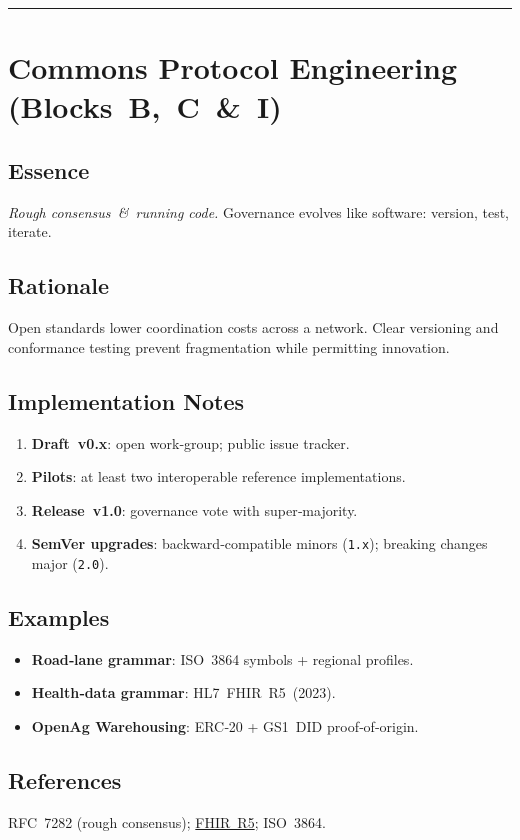 \bigskip\hrule\bigskip

\section{Commons Protocol Engineering (Blocks B, C \& I)}\label{sec:protocol}
\subsection*{Essence}
\emph{Rough consensus \& running code.} Governance evolves like software: version, test, iterate.

\subsection*{Rationale}
Open standards lower coordination costs across a network. Clear versioning and conformance testing prevent fragmentation while permitting innovation.

\subsection*{Implementation Notes}
\begin{enumerate}
  \item \textbf{Draft v0.x}: open work‑group; public issue tracker.
  \item \textbf{Pilots}: at least two interoperable reference implementations.
  \item \textbf{Release v1.0}: governance vote with super‑majority.
  \item \textbf{SemVer upgrades}: backward‑compatible minors (\texttt{1.x}); breaking changes major (\texttt{2.0}).
\end{enumerate}

\subsection*{Examples}
\begin{itemize}
  \item \textbf{Road‑lane grammar}: ISO 3864 symbols + regional profiles.
  \item \textbf{Health‑data grammar}: HL7 FHIR R5 (2023).
  \item \textbf{OpenAg Warehousing}: ERC‑20 + GS1 DID proof‑of‑origin.
\end{itemize}

\subsection*{References}
RFC 7282 (rough consensus); \href{https://hl7.org/fhir}{FHIR R5}; ISO 3864.

